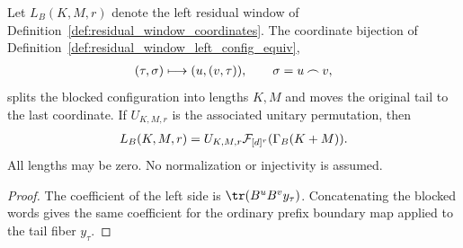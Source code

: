 \begin{lemma}
    \label{thm:residual_window_left_fiberwise_coordinates}
    \leanok
    Let $L_B(K,M,r)$ denote the left residual window of
    Definition~\ref{def:residual_window_coordinates}.
    The coordinate bijection of
    Definition~\ref{def:residual_window_left_config_equiv},
    \begin{align}
        (\tau,\sigma)\longmapsto(u,(v,\tau)),\qquad
        \sigma=u\mathbin{\frown}v,
        \notag
    \end{align}
    splits the blocked configuration into lengths $K,M$ and moves the
    original tail to the last coordinate. If $U_{K,M,r}$ is the associated
    unitary permutation, then
    \begin{align}
        L_B(K,M,r)=U_{K,M,r}\mathcal F_{[d]^r}(\Gamma_B(K+M)).
        \notag
    \end{align}
    All lengths may be zero. No normalization or injectivity is assumed.
\end{lemma}
\begin{proof}\leanok
    The coefficient of the left side is $\tr(B^uB^v y_\tau)$.
    Concatenating the blocked words gives the same coefficient for the
    ordinary prefix boundary map applied to the tail fiber $y_\tau$.
\end{proof}

